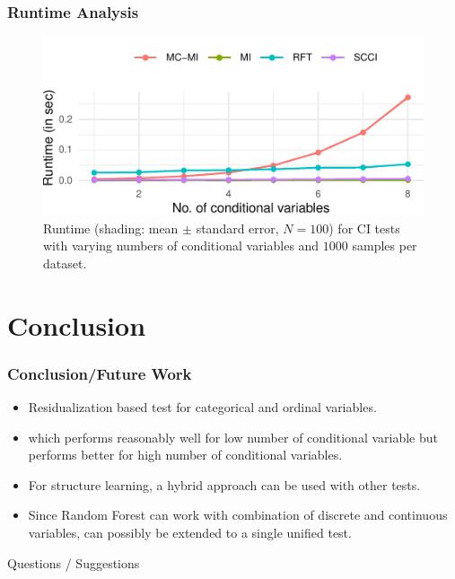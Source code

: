 \documentclass{beamer}
\begin{document}
\begin{frame}
	\frametitle{Runtime Analysis}
	\begin{figure}
		\centering
		\includegraphics{imgs/runtime.pdf}
		\caption*{Runtime (shading: mean $\pm$ standard error, $N=100$)
		for CI tests with varying numbers of conditional variables and
		$1000$ samples per dataset.
		}
	\end{figure}
\end{frame}

\section{Conclusion}
\begin{frame}
	\frametitle{Conclusion/Future Work}
	\begin{itemize}
		\setlength\itemsep{1em}
		\item Residualization based test for categorical and ordinal variables.
		\item which performs reasonably well for low number of
			conditional variable but performs better for high
			number of conditional variables.
		\item For structure learning, a hybrid approach can be used with other
			tests.
		\item Since Random Forest can work with combination of discrete and 
			continuous variables, can possibly be extended to a single 
			unified test.
	\end{itemize}
\end{frame}

\begin{frame}
	\begin{center}
		\Huge{Questions / Suggestions}
	\end{center}
\end{frame}
\end{document}
